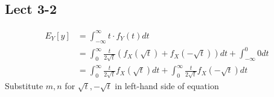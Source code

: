 \documentclass[11pt,letterpaper]{article}
\begin{document}
%

\subsection*{Lect 3-2}
\begin{align*}
E_{Y}[y] &= \int_{-\infty}^{\infty} t \cdot f_Y (t) dt \\
&=  \int^{\infty}_{0} \frac{t}{2 \sqrt{t}}  ( f_X(\sqrt{t}) + f_X(- \sqrt{t}) ) dt + \int_{-\infty}^{0} 0 dt \\
&= \int^{\infty}_{0} \frac{t}{2 \sqrt{t}}   f_X(\sqrt{t}) dt + \int^{\infty}_{0} \frac{t}{2 \sqrt{t}}  f_X(-\sqrt{t}) dt
\end{align*}
Substitute $m, n$ for $\sqrt{t}, -\sqrt{t}$ in left-hand side of equation\\
\end{document}
